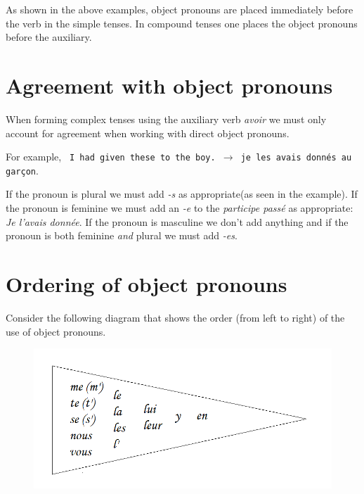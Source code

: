 \documentclass[11pt, oneside]{book}
\begin{document}
{{{As shown in the above examples, object pronouns are placed immediately before the verb in the simple tenses. In compound tenses one places the object pronouns before the auxiliary.    \vspace{0.5\baselineskip}

\section{Agreement with object pronouns}

When forming complex tenses using the auxiliary verb \textit{avoir} we must only account for agreement when working with direct object pronouns.  \vspace{0.5\baselineskip}

For example, \texttt{ I had given these to the boy. $\rightarrow$ je les avais donn\'es au gar\c{c}on}.  \vspace{0.5\baselineskip}

If the pronoun is plural we must add \textit{-s} as appropriate(as seen in the example). If the pronoun is feminine we must add an \textit{-e} to the \textit{participe pass\'e} as appropriate: \textit{Je l'avais donn\'ee}. If the pronoun is masculine we don't add anything and if the pronoun is both feminine \textit{and} plural we must add \textit{-es}.  \vspace{0.5\baselineskip}
\newpage
\section{Ordering of object pronouns}

Consider the following diagram that shows the order (from left to right) of the use of object pronouns.

\begin{figure}[H]
	\includegraphics[scale=0.6]{charts/objectorder.png}
\end{figure} \vspace{0.5\baselineskip} 

}}}
\end{document}
